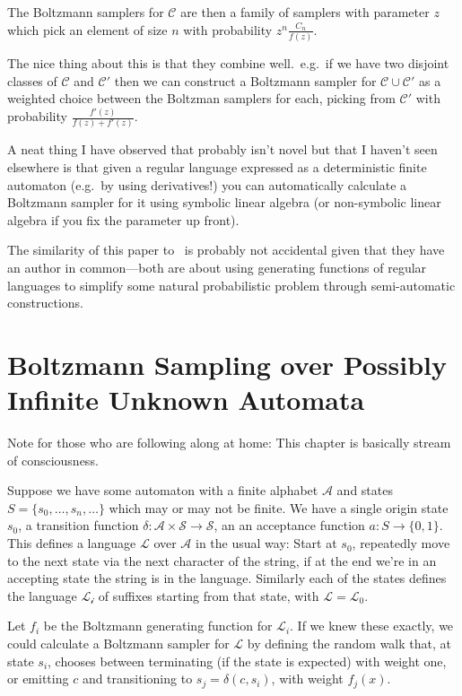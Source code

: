 \documentclass[a4paper]{book}
\begin{document}
The Boltzmann samplers for \(\mathcal{C}\) are then a family of samplers with parameter \(z\) which pick an element of size \(n\) with probability \(z^n \frac{C_n}{f(z)}\).

The nice thing about this is that they combine well.\ 
e.g.\ if we have two disjoint classes of \(\mathcal{C}\) and \(\mathcal{C}'\) then we can construct a Boltzmann sampler for \(\mathcal{C} \cup \mathcal{C}'\) as a weighted choice between the Boltzman samplers for each,
picking from \(\mathcal{C}'\) with probability \(\frac{f'(z)}{f(z) + f'(z)}\).

A neat thing I have observed\cite{falbs} that probably isn't novel but that I haven't seen elsewhere is that given a regular language expressed as a deterministic finite automaton
(e.g.\ by using derivatives!)
you can automatically calculate a Boltzmann sampler for it using symbolic linear algebra
(or non-symbolic linear algebra if you fix the parameter up front).

The similarity of this paper to~\cite{DBLP:journals/dam/FlajoletGT92} is probably not accidental given that they have an author in common---both
are about using generating functions of regular languages to simplify some natural probabilistic problem through semi-automatic constructions.

\section{Boltzmann Sampling over Possibly Infinite Unknown Automata}

Note for those who are following along at home:
This chapter is basically stream of consciousness.

Suppose we have some automaton with a finite alphabet \(\mathcal{A}\) and states \(S = \{s_0, \ldots, s_n, \ldots\}\) which may or may not be finite.
We have a single origin state \(s_0\),
a transition function \(\delta: \mathcal{A} \times \mathcal{S} \to \mathcal{S}\),
an an acceptance function \(a: S \to \{0, 1\}\).
This defines a language \(\mathcal{L}\) over \(\mathcal{A}\) in the usual way:
Start at \(s_0\), repeatedly move to the next state via the next character of the string,
if at the end we're in an accepting state the string is in the language.
Similarly each of the states defines the language \(\mathcal{L_i}\) of suffixes starting from that state,
with \(\mathcal{L} = \mathcal{L}_0\).

Let \(f_i\) be the Boltzmann generating function for \(\mathcal{L}_i\).
If we knew these exactly,
we could calculate a Boltzmann sampler for \(\mathcal{L}\) by defining the random walk that,
at state \(s_i\),
chooses between terminating (if the state is expected) with weight one,
or emitting \(c\) and transitioning to \(s_j = \delta(c, s_i)\),
with weight \(f_j(x)\).
\end{document}
